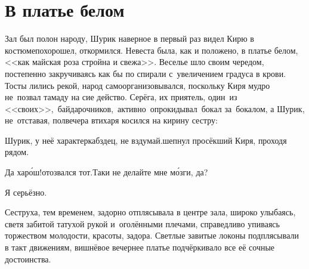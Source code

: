 {
\chapter{В платье белом}
\vepsianrose

\fancyhead[LE]{\fancyplain{}{\bfseries \parttitle}}
\fancyhead[RO]{\fancyplain{}{\bfseries \rightmark}}

Зал был полон народу, Шурик наверное в первый раз видел Кирю в костюме\mdash похорошел, откормился. Невеста была, как и положено, в платье белом, <<как майская роза стройна и свежа>>. Веселье шло своим чередом, постепенно закручиваясь как бы по спирали с~увеличением градуса в крови. Тосты лились рекой, народ самоорганизовывался, поскольку Киря мудро не~позвал тамаду на сие действо. Серёга, их приятель, один~из <<своих>>,~байдарочников,~активно~опрокидывал~бокал за~бокалом, а Шурик, не~отставая, полвечера втихаря косился на кирину сестру:

\diagdash Шурик, у неё характер\mdash кабздец, не вздумай.\mdash шепнул просёкший Киря, проходя рядом. 

\diagdash Да хар\'{о}ш!\mdash отозвался тот.\mdash Таки не делайте мне м\'{о}зги, да?

\diagdash Я серьёзно.

Сеструха, тем временем, задорно отплясывала в центре зала, широко улыбаясь, светя забитой татухой рукой и~оголёнными плечами, справедливо упиваясь торжеством молодости, красоты, задора. Светлые завитые локоны подплясывали в такт движениям, вишнёвое вечернее платье подчёркивало все её сочные достоинства.

%
%
%

\noindent
\begin{minipage}{0.48\textwidth}
	\setlength{\parindent}{1.0cm}  %
	

\end{minipage}}
